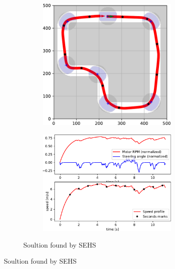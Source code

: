 \begin{figure}[!tbp]
	\vspace{0.75cm}
	
	\begin{subfigure}[t]{\textwidth}
		\begin{subfigure}[t]{0.45\textwidth}
			\includegraphics[width=\textwidth]{../img/experiments/simple-sehs-trajectory}
		\end{subfigure}
		\hfill
		\begin{subfigure}[t]{0.45\textwidth}
			\includegraphics[width=\textwidth]{../img/experiments/simple-sehs-actuators}
		\end{subfigure}
		\caption{Soultion found by SEHS}
		\label{fig:simple-sehs}
	\end{subfigure}


\end{figure}
